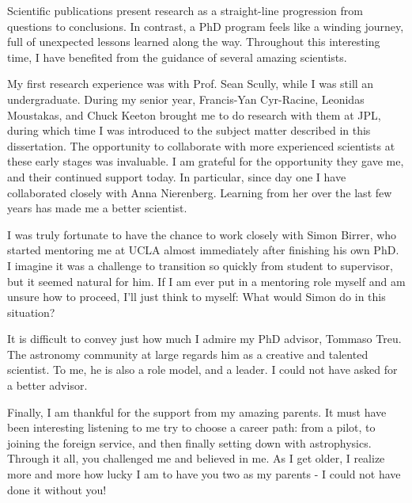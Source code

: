 {\indent Scientific publications present research as a straight-line progression from questions to conclusions. In contrast, a PhD program feels like a winding journey, full of unexpected lessons learned along the way. Throughout this interesting time, I have benefited from the guidance of several amazing scientists. 
	
My first research experience was with Prof. Sean Scully, while I was still an undergraduate. During my senior year, Francis-Yan Cyr-Racine, Leonidas Moustakas, and Chuck Keeton brought me to do research with them at JPL, during which time I was introduced to the subject matter described in this dissertation. The opportunity to collaborate with more experienced scientists at these early stages was invaluable. I am grateful for the opportunity they gave me, and their continued support today. In particular, since day one I have collaborated closely with Anna Nierenberg. Learning from her over the last few years has made me a better scientist. 

I was truly fortunate to have the chance to work closely with Simon Birrer, who started mentoring me at UCLA almost immediately after finishing his own PhD. I imagine it was a challenge to transition so quickly from student to supervisor, but it seemed natural for him. If I am ever put in a mentoring role myself and am unsure how to proceed, I'll just think to myself: What would Simon do in this situation? 

It is difficult to convey just how much I admire my PhD advisor, Tommaso Treu. The astronomy community at large regards him as a creative and talented scientist. To me, he is also a role model, and a leader. I could not have asked for a better advisor.  

Finally, I am thankful for the support from my amazing parents. It must have been interesting listening to me try to choose a career path: from a pilot, to joining the foreign service, and then finally setting down with astrophysics. Through it all, you challenged me and believed in me. As I get older, I realize more and more how lucky I am to have you two as my parents - I could not have done it without you! 
}